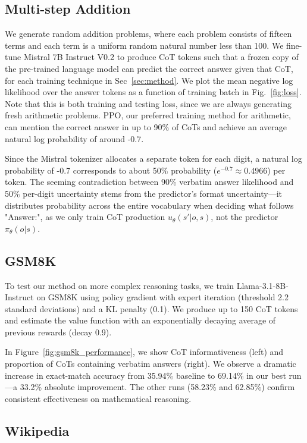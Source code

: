 \documentclass[letterpaper]{article} %
\begin{document}
\subsection{Multi-step Addition}
\label{subsec:solving}
We generate random addition problems, where each problem consists of fifteen terms and each term is a uniform random natural number less than 100. We fine-tune Mistral 7B Instruct V0.2 to produce CoT tokens such that a frozen copy of the pre-trained language model can predict the correct answer given that CoT, for each training technique in Sec~\ref{sec:method}. We plot the mean negative log likelihood over the answer tokens as a function of training batch in Fig.~\ref{fig:loss}. Note that this is both training and testing loss, since we are always generating fresh arithmetic problems. PPO, our preferred training method for arithmetic, can mention the correct answer in up to 90\% of CoTs and achieve an average natural log probability of around -0.7. 

Since the Mistral tokenizer allocates a separate token for each digit, a natural log probability of -0.7 corresponds to about 50\% probability ($e^{-0.7} \approx 0.4966$) per token. The seeming contradiction between 90\% verbatim answer likelihood and 50\% per-digit uncertainty stems from the predictor's format uncertainty—it distributes probability across the entire vocabulary when deciding what follows "Answer:", as we only train CoT production $u_\theta(s'|o,s)$, not the predictor $\pi_\theta(o|s)$.

\subsection{GSM8K}
\label{subsec:gsm8k}
To test our method on more complex reasoning tasks, we train Llama-3.1-8B-Instruct on GSM8K using policy gradient with expert iteration (threshold 2.2 standard deviations) and a KL penalty (0.1). We produce up to 150 CoT tokens and estimate the value function with an exponentially decaying average of previous rewards (decay 0.9).

In Figure~\ref{fig:gsm8k_performance}, we show CoT informativeness (left) and proportion of CoTs containing verbatim answers (right). We observe a dramatic increase in exact-match accuracy from 35.94\% baseline to 69.14\% in our best run—a 33.2\% absolute improvement. The other runs (58.23\% and 62.85\%) confirm consistent effectiveness on mathematical reasoning.

\subsection{Wikipedia}
\label{subsec:wikipedia}
\end{document}
